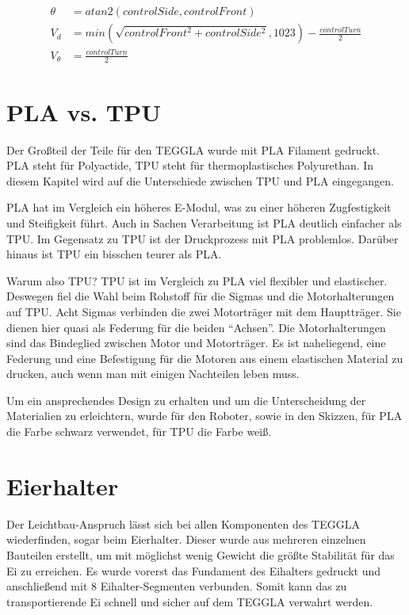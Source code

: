 \begin{align}
	\theta &= atan2(controlSide, controlFront)\\
	V_d &= min(\sqrt{controlFront^2 + controlSide^2}, 1023) - \frac{controlTurn}{2}\\
	V_\theta &= \frac{controlTurn}{2}
\end{align}


\section{PLA vs. TPU}
Der Großteil der Teile für den TEGGLA wurde mit PLA Filament gedruckt. 
PLA steht für Polyactide, TPU steht für thermoplastisches Polyurethan. 
In diesem Kapitel wird auf die Unterschiede zwischen TPU und PLA eingegangen. 

PLA hat im Vergleich ein höheres E-Modul, was zu einer höheren Zugfestigkeit und Steifigkeit führt. 
Auch in Sachen Verarbeitung ist PLA deutlich einfacher als TPU. 
Im Gegensatz zu TPU ist der Druckprozess mit PLA problemlos. 
Darüber hinaus ist TPU ein bisschen teurer als PLA. 

Warum also TPU? TPU ist im Vergleich zu PLA viel flexibler und elastischer. 
Deswegen fiel die Wahl beim Rohstoff für die Sigmas und die Motorhalterungen auf TPU. 
Acht Sigmas verbinden die zwei Motorträger mit dem Hauptträger. 
Sie dienen hier quasi als Federung für die beiden ``Achsen''. 
Die Motorhalterungen sind das Bindeglied zwischen Motor und Motorträger. 
Es ist naheliegend, eine Federung und eine Befestigung für die Motoren aus einem elastischen Material zu drucken, auch wenn man mit einigen Nachteilen leben muss.

Um ein ansprechendes Design zu erhalten und um die Unterscheidung der Materialien zu erleichtern, wurde für den Roboter, sowie in den Skizzen, für PLA die Farbe schwarz verwendet, für TPU die Farbe weiß.


\section{Eierhalter}					
Der Leichtbau-Anspruch lässt sich bei allen Komponenten des TEGGLA wiederfinden, sogar beim Eierhalter. 
Dieser wurde aus mehreren einzelnen Bauteilen erstellt, um mit möglichst wenig Gewicht die größte Stabilität für das Ei zu erreichen. 
Es wurde vorerst das Fundament des Eihalters gedruckt und anschließend mit 8 Eihalter-Segmenten verbunden. 
Somit kann das zu transportierende Ei schnell und sicher auf dem TEGGLA verwahrt werden. 

